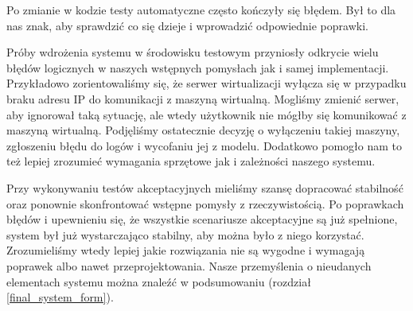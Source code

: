 \documentclass[../analiza-rozwiazania.tex]{subfiles}
\begin{document}
Po zmianie w kodzie testy automatyczne często kończyły się błędem.
Był to dla nas znak, aby sprawdzić co się dzieje i wprowadzić odpowiednie poprawki.

Próby wdrożenia systemu w środowisku testowym przyniosły odkrycie wielu błędów logicznych w naszych wstępnych pomysłach jak i samej implementacji.
Przykładowo zorientowaliśmy się, że serwer wirtualizacji wyłącza się w przypadku braku adresu IP do komunikacji z maszyną wirtualną.
Mogliśmy zmienić serwer, aby ignorował taką sytuację, ale wtedy użytkownik nie mógłby się komunikować z maszyną wirtualną.
Podjęliśmy ostatecznie decyzję o wyłączeniu takiej maszyny, zgłoszeniu błędu do logów i wycofaniu jej z modelu.
Dodatkowo pomogło nam to też lepiej zrozumieć wymagania sprzętowe jak i zależności naszego systemu.

Przy wykonywaniu testów akceptacyjnych mieliśmy szansę dopracować stabilność oraz ponownie skonfrontować wstępne pomysły z rzeczywistością.
Po poprawkach błędów i upewnieniu się, że wszystkie scenariusze akceptacyjne są już spełnione, system był już wystarczająco stabilny, aby można było z niego korzystać.
Zrozumieliśmy wtedy lepiej jakie rozwiązania nie są wygodne i wymagają poprawek albo nawet przeprojektowania.
Nasze przemyślenia o nieudanych elementach systemu można znaleźć w podsumowaniu (rozdział \ref{final_system_form}).
\end{document}
